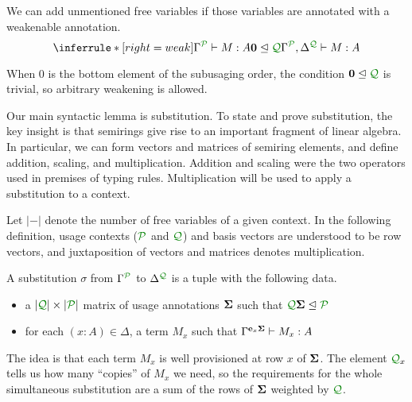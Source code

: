 \begin{lemma}[Weakening]
  \label{lem:weak}
  We can add unmentioned free variables if those variables are annotated with a
  weakenable annotation.
  \[
    \inferrule*[right=weak]{
      \ctx{\Gamma}{P} \vdash M : A
      \\ \vct 0 \subres \resctx Q
    }
    {
      \ctx{\Gamma}{P}, \ctx{\Delta}{Q} \vdash M : A
    }
  \]
\end{lemma}

When $0$ is the bottom element of the subusaging order, the condition $\vct 0
\subres \resctx Q$ is trivial, so arbitrary weakening is allowed.

Our main syntactic lemma is substitution.
To state and prove substitution, the key insight is that semirings give rise to
an important fragment of linear algebra.
In particular, we can form vectors and matrices of semiring elements, and define
addition, scaling, and multiplication.
Addition and scaling were the two operators used in premises of typing rules.
Multiplication will be used to apply a substitution to a context.


Let $|-|$ denote the number of free variables of a given context.
In the following definition, usage contexts ($\resctx P$ and $\resctx Q$) and
basis vectors are understood to be row vectors, and juxtaposition of vectors and
matrices denotes multiplication.

\begin{definition}
  A substitution $\sigma$ from $\Gamma^{\resctx P}$ to
  $\Delta^{\resctx Q}$ is a tuple with the following data.

  \begin{itemize}
  \item a $|\resctx Q| \times |\resctx P|$ matrix of usage annotations $\mathbf{\Sigma}$ such that $\resctx Q \mat \Sigma \subres \resctx P$
  \item for each $(x:A) \in \Delta$, a term $M_x$ such that
    $\Gamma^{\mathbf{e}_x \mathbf{\Sigma}} \vdash M_x : A$
  \end{itemize}
\end{definition}

The idea is that each term $M_x$ is well provisioned at row $x$ of $\mathbf{\Sigma}$.
The element $\resctx Q_x$ tells us how many ``copies'' of $M_x$ we need, so the
requirements for the whole simultaneous substitution are a sum of the rows of
$\mathbf{\Sigma}$ weighted by $\resctx Q$.

